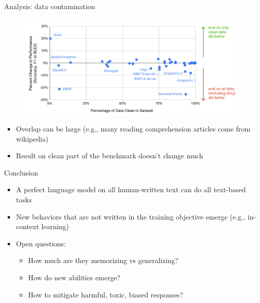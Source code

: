 \documentclass[usenames,dvipsnames,notes,11pt,aspectratio=169,hyperref={colorlinks=true, linkcolor=blue}]{beamer}
\begin{document}
\begin{frame}
    {Analysis: data contamination}
    \begin{figure}
        \includegraphics[height=0.6\textheight]{figures/gpt3-contamination}
    \end{figure}
    \begin{itemize}
        \item Overlap can be large (e.g., many reading comprehension articles come from wikipedia) 
        \item Result on clean part of the benchmark doesn't change much
    \end{itemize}
\end{frame}

\begin{frame}
    {Conclusion}
    \begin{itemize}
        \item A perfect language model on all human-written text can do all text-based tasks
        \item New behaviors that are not written in the training objective emerge (e.g., in-context learning)
        \item Open questions:
            \begin{itemize}
                \item How much are they memorizing vs generalizing?
                \item How do new abilities emerge?
                \item How to mitigate harmful, toxic, biased responses?
            \end{itemize}
    \end{itemize}
\end{frame}
\end{document}

